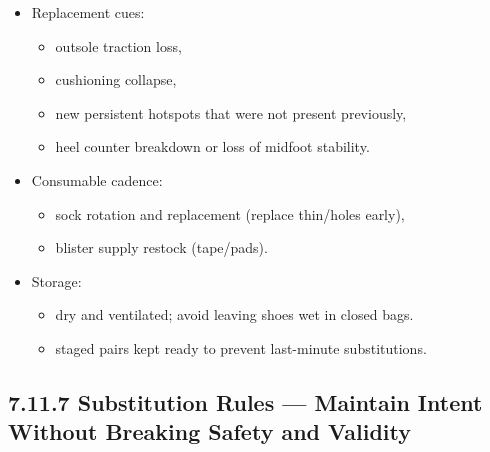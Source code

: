 \documentclass[10pt]{article}
\begin{document}
\begin{itemize}
\item Replacement cues:
  \begin{itemize}
  \item outsole traction loss,
  \item cushioning collapse,
  \item new persistent hotspots that were not present previously,
  \item heel counter breakdown or loss of midfoot stability.
  \end{itemize}
\item Consumable cadence:
  \begin{itemize}
  \item sock rotation and replacement (replace thin/holes early),
  \item blister supply restock (tape/pads).
  \end{itemize}
\item Storage:
  \begin{itemize}
  \item dry and ventilated; avoid leaving shoes wet in closed bags.
  \item staged pairs kept ready to prevent last-minute substitutions.
  \end{itemize}
\end{itemize}

\subsection*{7.11.7 Substitution Rules — Maintain Intent Without Breaking Safety and Validity}
{}
\end{document}
